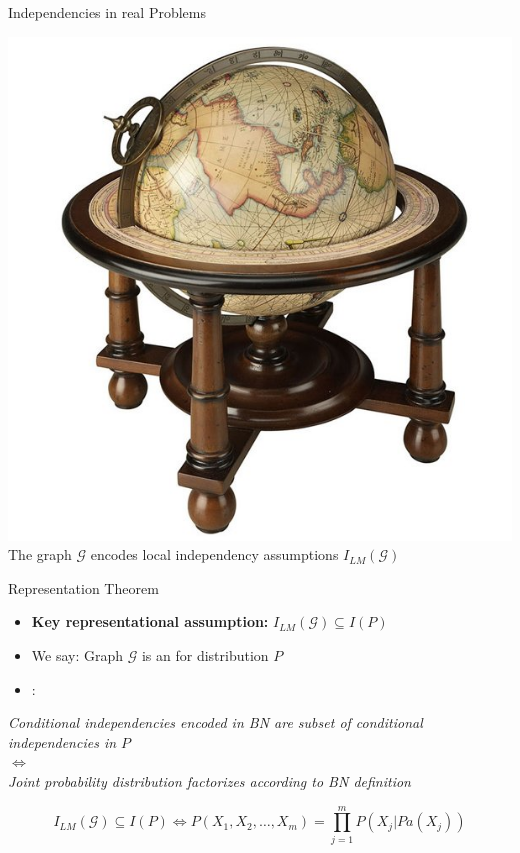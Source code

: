 \begin{frame}{Independencies in real Problems}{}
{\begin{boxBlueNoFill}
\begin{center}
				\includegraphics[scale=0.1]{15_pgm/02_img/globe} \\
				\vspace*{2mm}
				{\footnotesize The graph $\mathcal{G}$ encodes local independency assumptions $I_{LM}(\mathcal{G})$}
			\end{center}
			\vfill
		\end{boxBlueNoFill}
	}
\end{frame}


\begin{frame}{Representation Theorem}{}
	\begin{itemize}
		\item \textbf{Key representational assumption:} $I_{LM}(\mathcal{G}) \subseteq I(P)$
		\item We say: Graph $\mathcal{G}$ is an  for distribution $P$
		\item {}:
	\end{itemize}

	\begin{center}
		\footnotesize
		\textit{Conditional independencies encoded in BN are subset of conditional independencies in $P$ \\
			$\Leftrightarrow$ \\
			Joint probability distribution factorizes according to BN definition}
	\end{center}

	\vspace*{-4mm}
	\begin{equation}
		I_{LM}(\mathcal{G}) \subseteq I(P) \Leftrightarrow P(X_1, X_2, \dots, X_m) = \prod_{j=1}^m P(X_j \vert Pa(X_j))
	\end{equation}
\end{frame}


